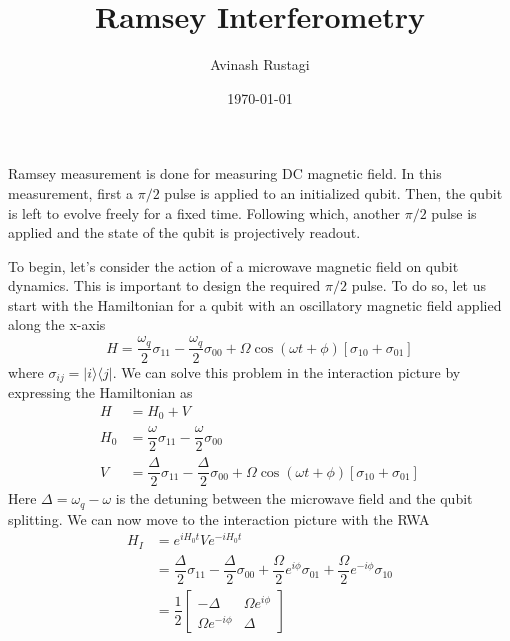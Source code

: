 \documentclass[aps,prl,onecolumn,notitlepage,showpacs,floatfix,superscriptaddress]{revtex4-1}
\begin{document}
\title{Ramsey Interferometry}

\author{Avinash Rustagi}
\date{\today}
\maketitle

Ramsey measurement is done for measuring DC magnetic field. In this measurement, first a $\pi/2$ pulse is applied to an initialized qubit. Then, the qubit is left to evolve freely for a fixed time. Following which, another $\pi/2$ pulse is applied and the state of the qubit is projectively readout. 

To begin, let's consider the action of a microwave magnetic field on qubit dynamics. This is important to design the required $\pi/2$ pulse. To do so, let us start with the Hamiltonian for a qubit with an oscillatory magnetic field applied along the x-axis
\begin{equation}
H = \dfrac{\omega_q}{2} \sigma_{11} - \dfrac{\omega_q}{2} \sigma_{00} + \Omega \cos(\omega t +\phi) [\sigma_{10}+\sigma_{01}]
\end{equation}
where $\sigma_{ij} = \vert i \rangle \langle j \vert$. We can solve this problem in the interaction picture by expressing the Hamiltonian as
\begin{equation}
\begin{split}
H &= H_0 + V \\
H_0 &= \dfrac{\omega}{2} \sigma_{11} - \dfrac{\omega}{2} \sigma_{00} \\
V &=\dfrac{\Delta}{2} \sigma_{11} - \dfrac{\Delta}{2} \sigma_{00}+ \Omega \cos(\omega t +\phi) [\sigma_{10}+\sigma_{01}]
\end{split}
\end{equation}
Here $\Delta = \omega_q - \omega$ is the detuning between the microwave field and the qubit splitting. We can now move to the interaction picture with the RWA
\begin{equation}
\begin{split}
H_I &= e^{i H_0 t} V e^{-i H_0 t} \\
&= \dfrac{\Delta}{2} \sigma_{11} - \dfrac{\Delta}{2} \sigma_{00}+ \dfrac{\Omega}{2} e^{i\phi} \sigma_{01} + \dfrac{\Omega}{2} e^{-i\phi} \sigma_{10} \\
&= \dfrac{1}{2} \left[ \begin{array}{cc}
-\Delta & \Omega e^{i\phi} \\ 
\Omega e^{-i\phi} & \Delta
\end{array} \right] 
\end{split}
\end{equation}
\end{document}
